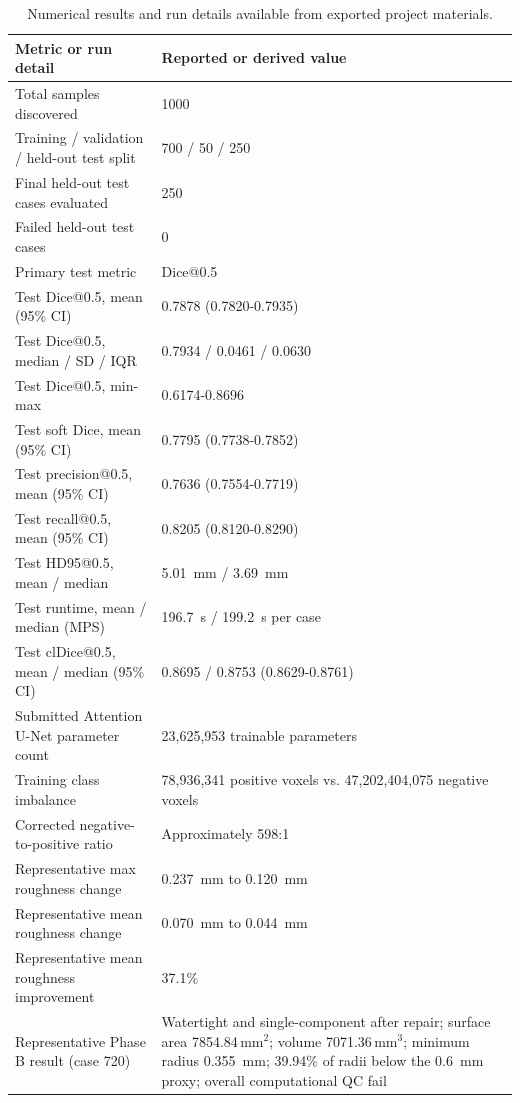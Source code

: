 \documentclass[anonymous]{iopjournal}
\begin{document}
\begin{table}[H]
\centering
\caption{Numerical results and run details available from exported project materials.}
\label{tab:results}
\begin{threeparttable}
\footnotesize
\begin{tabularx}{0.92\textwidth}
{L{0.42\textwidth}Y}
\toprule
\textbf{Metric or run detail}
&
\textbf{Reported or derived value}
\\
\midrule
Total samples discovered
&
1000
\\
Training / validation / held-out test split
&
700 / 50 / 250
\\
Final held-out test cases evaluated
&
250
\\
Failed held-out test cases
&
0
\\
Primary test metric
&
Dice@0.5
\\
Test Dice@0.5, mean (95\% CI)
&
0.7878 (0.7820-0.7935)
\\
Test Dice@0.5, median / SD / IQR
&
0.7934 / 0.0461 / 0.0630
\\
Test Dice@0.5, min-max
&
0.6174-0.8696
\\
Test soft Dice, mean (95\% CI)
&
0.7795 (0.7738-0.7852)
\\
Test precision@0.5, mean (95\% CI)
&
0.7636 (0.7554-0.7719)
\\
Test recall@0.5, mean (95\% CI)
&
0.8205 (0.8120-0.8290)
\\
Test HD95@0.5, mean / median
&
\SI{5.01}{mm} / \SI{3.69}{mm}
\\
Test runtime, mean / median (MPS)
&
\SI{196.7}{s} / \SI{199.2}{s} per case
\\
Test clDice@0.5, mean / median (95\% CI)
&
0.8695 / 0.8753 (0.8629-0.8761)
\\
Submitted Attention U-Net parameter count
&
23,625,953 trainable parameters
\\
Training class imbalance
&
78,936,341 positive voxels vs. 47,202,404,075 negative voxels
\\
Corrected negative-to-positive ratio
&
Approximately 598:1
\\
Representative max roughness change
&
\SI{0.237}{mm} to \SI{0.120}{mm}
\\
Representative mean roughness change
&
\SI{0.070}{mm} to \SI{0.044}{mm}
\\
Representative mean roughness improvement
&
37.1\%
\\
Representative Phase B result (case 720)
&
Watertight and single-component after repair; surface area 7854.84\,mm$^2$; volume 7071.36\,mm$^3$; minimum radius \SI{0.355}{mm}; 39.94\% of radii below the \SI{0.6}{mm} proxy; overall computational QC fail

\end{tabularx}
\end{threeparttable}
\end{table}
\end{document}
